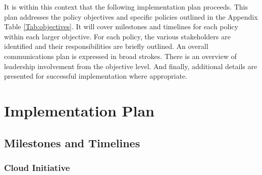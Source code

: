 \documentclass[stu]{apa7}
\begin{document}
It is within this context that the following implementation plan proceeds. This plan addresses the policy objectives and specific policies outlined in the Appendix Table \ref{Tab:objectives}. It will cover milestones and timelines for each policy within each larger objective. For each policy, the various stakeholders are identified and their responsibilities are briefly outlined. An overall communications plan is expressed in broad strokes. There is an overview of leadership involvement from the objective level. And finally, additional details are presented for successful implementation where appropriate.

\section{Implementation Plan}
\label{sec:org0c626a1}

\subsection{Milestones and Timelines}
\label{sec:orgfc043a5}

\subsubsection{Cloud Initiative}
\label{sec:org6d11b95}
\end{document}
